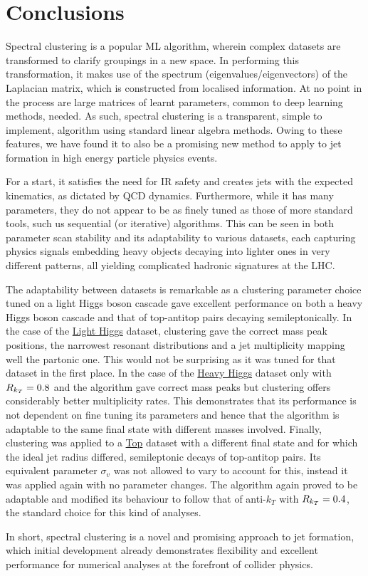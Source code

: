 \section{Conclusions}

Spectral clustering is a popular ML algorithm, wherein complex datasets are transformed to clarify groupings in a new space.
In performing this transformation, it makes use of the spectrum (eigenvalues/eigenvectors) of the Laplacian matrix, which is constructed from localised information.
At no point in the process are large matrices of learnt parameters, common to deep learning methods, needed.
As such, spectral clustering is a transparent, simple to implement, algorithm using standard linear algebra methods. 
Owing to these features,  we have found it to also be 
a promising new method to apply to jet formation in high energy particle physics events.

For a start, it satisfies the need for IR safety and creates jets with the expected kinematics, as dictated by QCD dynamics. Furthermore, 
while it has many parameters, they do not appear to be as finely tuned as those of more standard tools, such us sequential (or iterative) \genkt{} algorithms.
This can be seen in both parameter scan stability and its adaptability to various datasets,
each capturing physics signals embedding heavy objects decaying into lighter ones in very different patterns, all yielding complicated hadronic signatures at the LHC.

The adaptability between datasets is remarkable as a \spectral{} clustering parameter choice tuned on a light Higgs boson cascade
gave excellent performance on both a heavy Higgs boson cascade and that of top-antitop pairs decaying semileptonically.
In the case of the \underline{Light Higgs} dataset, \spectral{} clustering gave the correct mass peak positions, the narrowest resonant distributions and a jet multiplicity mapping well the partonic one. This would not be surprising as it was tuned for that dataset in the first place.
In the case of the \underline{Heavy Higgs} dataset only \antikt{} with \(R_{k_T}{} = 0.8\) 
and the \spectral{} algorithm gave correct mass peaks but  \spectral{} clustering offers considerably better multiplicity rates.
This demonstrates that its performance is not dependent on fine tuning its parameters and hence that the algorithm is adaptable to the same final state with different masses involved.
Finally, \spectral{} clustering was applied to a \underline{Top} dataset with a different final state and 
for which the ideal jet radius differed, semileptonic decays of top-antitop pairs.
Its equivalent parameter \(\sigma_v\) was not allowed to vary to account for this, instead it was applied again with no parameter changes.
The algorithm again proved to be adaptable and modified its behaviour to follow that of anti-$k_T$ with \(R_{k_T}{} = 0.4\), the standard choice for this kind of analyses.

In short, spectral clustering is a novel and promising approach to jet formation, which initial development already demonstrates flexibility and excellent performance for numerical analyses at the forefront of collider physics.

